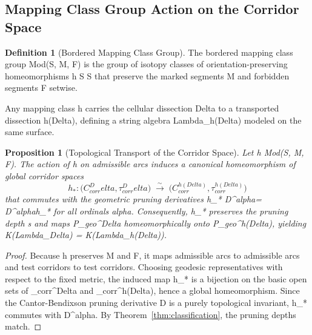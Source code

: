 \documentclass[11pt,a4paper,reqno]{amsart}
\def\({}%
\def\){}%
\def\mathcal#1{#1}%
\def\mathrm#1{#1}%
\def\operatorname#1{#1}%
\def\forb{F}%
\def\KG{K}%
\def\stgeo{s}%
\def\Dgeo{D}%
\def\alpha{alpha}%
\def\Delta{Delta}%
\def\Lambda{Lambda}%
\def\emph#1{#1}%
\newtheorem{proposition}[theorem]{Proposition}
\theoremstyle{definition}
\newtheorem{definition}[theorem]{Definition}
\theoremstyle{remark}
\newcommand{\KG}{\operatorname{KG}}
\newcommand{\forb}{\mathfrak{F}}
\newcommand{\Dgeo}{D_{\mathrm{geo}}}
\newcommand{\stgeo}{\operatorname{st}_{\mathrm{geo}}}
\begin{document}
\subsection{Mapping Class Group Action on the Corridor Space}
\label{subsec:mcg_action}

\begin{definition}[Bordered Mapping Class Group]
\label{def:mcg}
The \emph{bordered mapping class group} \(\operatorname{Mod}(\mathcal{S}, \mathcal{M}, \forb)\) is the group of isotopy classes of orientation-preserving homeomorphisms \(h \colon \mathcal{S} \xrightarrow{\sim} \mathcal{S}\) that preserve the marked segments \(\mathcal{M}\) and forbidden segments \(\forb\) setwise.
\end{definition}

Any mapping class \(h\) carries the cellular dissection \(\Delta\) to a transported dissection \(h(\Delta)\), defining a string algebra \(\Lambda_{h(\Delta)}\) modeled on the same surface.

\begin{proposition}[Topological Transport of the Corridor Space]
\label{prop:topological_transport}
Let \(h \in \operatorname{Mod}(\mathcal{S}, \mathcal{M}, \forb)\). The action of \(h\) on admissible arcs induces a canonical homeomorphism of global corridor spaces
\[
h_* \colon \bigl(\mathcal{C}_{\mathrm{corr}}^\Delta, \tau_{\mathrm{corr}}^\Delta\bigr) \;\xrightarrow{\;\sim\;}\; \bigl(\mathcal{C}_{\mathrm{corr}}^{h(\Delta)}, \tau_{\mathrm{corr}}^{h(\Delta)}\bigr)
\]
that commutes with the geometric pruning derivatives \(h_* \circ \Dgeo^\alpha = \Dgeo^\alpha \circ h_*\) for all ordinals \(\alpha\). Consequently, \(h_*\) preserves the pruning depth \(\stgeo\) and maps \(\mathcal{P}_{\mathrm{geo}}^\Delta\) homeomorphically onto \(\mathcal{P}_{\mathrm{geo}}^{h(\Delta)}\), yielding \(\KG(\Lambda_\Delta) = \KG(\Lambda_{h(\Delta)})\).
\end{proposition}

\begin{proof}
Because \(h\) preserves \(\mathcal{M}\) and \(\forb\), it maps admissible arcs to admissible arcs and test corridors to test corridors. Choosing geodesic representatives with respect to the fixed metric, the induced map \(h_*\) is a bijection on the basic open sets of \(\tau_{\mathrm{corr}}^\Delta\) and \(\tau_{\mathrm{corr}}^{h(\Delta)}\), hence a global homeomorphism. Since the Cantor-Bendixson pruning derivative \(\Dgeo\) is a purely topological invariant, \(h_*\) commutes with \(\Dgeo^\alpha\). By Theorem~\ref{thm:classification}, the pruning depths match.
\end{proof}
\end{document}
